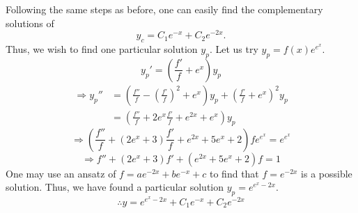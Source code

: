 \item

Following the same steps as before, one can easily find the complementary solutions of
\[
	y_c = C_1 e^{-x} + C_2 e^{-2x}.
\]
Thus, we wish to find one particular solution $y_p$.
Let us try $y_p = f(x) e^{e^x}$.
\[
	y_{p}' = \left( \frac{f'}{f} + e^x \right)y_p
\]
\begin{align*}
	\Rightarrow y_{p}''
	&= \left( \frac{f''}{f} - {\left( \frac{f'}{f} \right)}^2 + e^x \right)y_p + {\left( \frac{f'}{f} + e^x \right)}^2 y_p \\
	&= \left( \frac{f''}{f} + 2e^x \frac{f'}{f} + e^{2x} + e^x \right) y_p
\end{align*}
\[
	\Rightarrow \left( \frac{f''}{f} + (2e^x + 3) \frac{f'}{f} + e^{2x} + 5e^x + 2 \right)fe^{e^x} = e^{e^x}
\]
\[
	\Rightarrow f'' + (2e^x + 3)f' + (e^{2x} + 5e^x + 2)f = 1
\]
One may use an ansatz of $f = ae^{-2x} + be^{-x} + c$ to find that $f = e^{-2x}$ is a possible solution.
Thus, we have found a particular solution $y_p = e^{e^x - 2x}$.
\[
	\therefore y = e^{e^x - 2x} + C_1 e^{-x} + C_2 e^{-2x}
\]